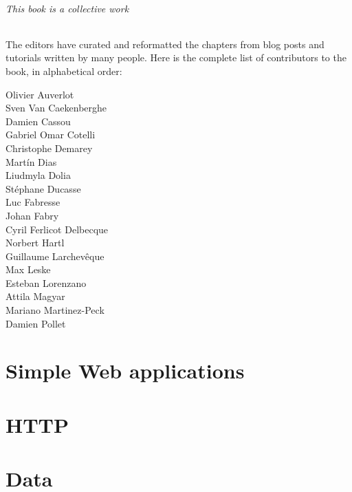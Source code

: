 \documentclass[10pt,twoside,english]{support/latex/sbabook/sbabook}
\begin{document}
\paragraph{This book is a collective work}
The editors have curated and reformatted the chapters from blog posts
and tutorials written by many people. Here is the complete list of contributors
to the book, in alphabetical order:

\begin{multicols}{3}
Olivier Auverlot\\
Sven Van Caekenberghe\\
Damien Cassou\\
Gabriel Omar Cotelli\\
Christophe Demarey\\
Martín Dias\\
Liudmyla Dolia\\
Stéphane Ducasse\\
Luc Fabresse\\
Johan Fabry\\
Cyril Ferlicot Delbecque\\
Norbert Hartl\\
Guillaume Larchevêque\\
Max Leske\\
Esteban Lorenzano\\
Attila Magyar\\
Mariano Martinez-Peck\\
Damien Pollet\\
\end{multicols}

\tableofcontents*
\clearpage\listoffigures

\mainmatter

\part{Simple Web applications}



\part{HTTP}





\part{Data}





\end{document}
